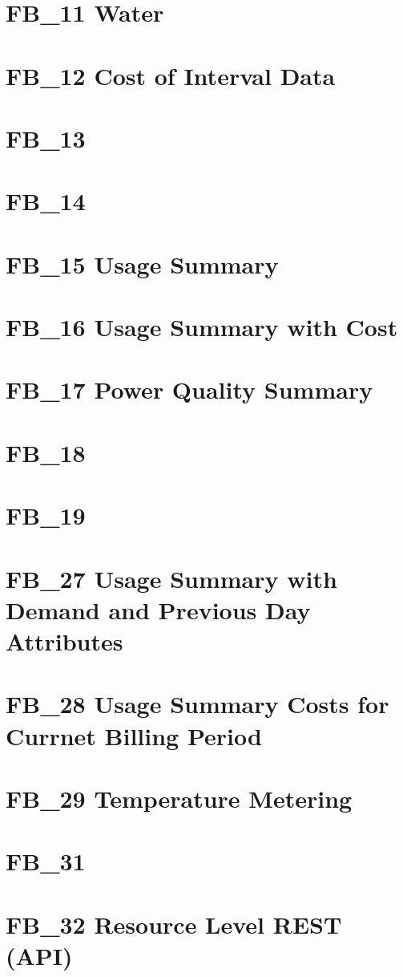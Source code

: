 \documentclass[a4paper,12pt,single,pdftex]{scrbook}
\begin{document}
\chapter{FB\_11 Water}
\chapter{FB\_12 Cost of Interval Data}
\chapter{FB\_13}
\chapter{FB\_14}
\chapter{FB\_15 Usage Summary}
\chapter{FB\_16 Usage Summary with Cost}
\chapter{FB\_17 Power Quality Summary}
\chapter{FB\_18}
\chapter{FB\_19}
\chapter{FB\_27 Usage Summary with Demand and Previous Day Attributes}
\chapter{FB\_28 Usage Summary Costs for Currnet Billing Period}
\chapter{FB\_29 Temperature Metering}
\chapter{FB\_31}
\chapter{FB\_32 Resource Level REST (API)}
\end{document}
